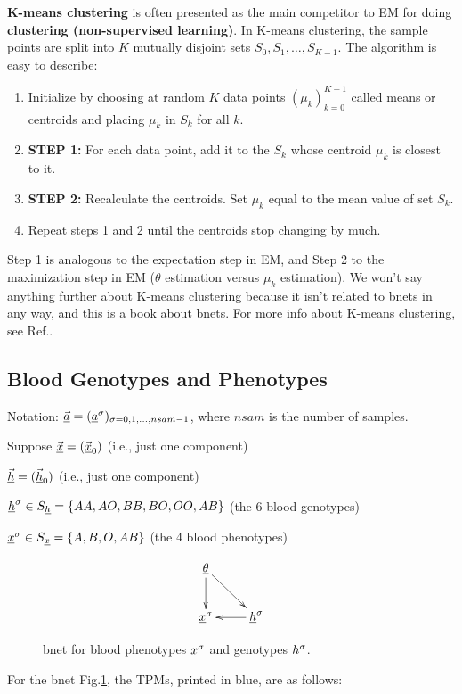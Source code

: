 {\bf K-means clustering} is often
presented as the main competitor
to EM for doing
{\bf clustering (non-supervised
learning)}. In K-means clustering,
the sample points are
split into $K$
mutually
disjoint sets $S_0, S_1, \ldots, S_{K-1}$.
The algorithm is easy
to describe:
\begin{enumerate}
\item
Initialize by
choosing  at random
$K$ data points $(\mu_k)_{k=0}^{K-1}$
called means or centroids
and placing $\mu_k$ in $S_k$
for all $k$.
 \item {\bf STEP 1:}
For each data point,
add it to the $S_k$
whose centroid $\mu_k$
is closest to it.
\item {\bf STEP 2:}
Recalculate the centroids.
Set $\mu_k$ equal to the mean value of set
$S_k$.
\item Repeat steps 1 and 2 until the
centroids stop changing
by much.
\end{enumerate}
Step 1 is analogous
to the expectation step in EM,
and Step 2 to the maximization
step in EM ($\theta$
estimation versus
$\mu_k$ estimation).
We won't say anything further
about K-means clustering because
it
isn't related to bnets in any
way, and this is a book about bnets.
For more info about
K-means clustering,
see Ref.\cite{wiki-k-means}.

\subsection{Blood Genotypes
and Phenotypes}

Notation:
$\vec{{\underline{a}}}=
({\underline{a}}^\sigma)_{\sigma=0, 1, \ldots,nsam-1}
$, where $nsam$
is the number of samples.


Suppose
$\vec{{\underline{x}}}=
(\vec{{\underline{x}}}_0)
$ (i.e., just one component)

$\vec{{\underline{h}}}=
(\vec{{\underline{h}}}_0)
$ (i.e., just one component)



${\underline{h}}^\sigma\in S_{\underline{h}}=
\{AA, AO, BB, BO, OO, AB\}$ (the 6 blood genotypes)

${\underline{x}}^\sigma\in S_{\underline{x}}=
\{A,B,O,AB\}$ (the 4 blood phenotypes)

\begin{figure}[h!]
$$
\xymatrix{
\ul{\theta}\ar[d]\ar[dr]
\\
\rvx^\s&\rvh^\s\ar[l]
}$$
\caption{bnet
for blood phenotypes $x^\sigma$
and genotypes $h^\sigma$.}
\label{fig-phenotypes}
\end{figure}

For the bnet Fig.\ref{fig-phenotypes},
the TPMs, printed in blue, are as follows:

